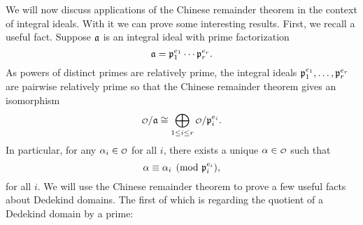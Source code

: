     We will now discuss applications of the Chinese remainder theorem in the context of integral ideals. With it we can prove some interesting results. First, we recall a useful fact. Suppose $\mathfrak{a}$ is an integral ideal with prime factorization
    \[
      \mathfrak{a} = \mathfrak{p}_{1}^{e_{1}} \cdots \mathfrak{p}_{r}^{e_{r}}.
    \]
    As powers of distinct primes are relatively prime, the integral ideals $\mathfrak{p}_{1}^{e_{1}},\ldots,\mathfrak{p}_{r}^{e_{r}}$ are pairwise relatively prime so that the Chinese remainder theorem gives an isomorphism
    \[
      \smc{O}/\mf{a} \cong \bigop_{1 \le i \le r}\smc{O}/\mf{p}_{i}^{e_{i}}.
    \]
    In particular, for any $\a_{i} \in \smc{O}$ for all $i$, there exists a unique $\a \in \smc{O}$ such that
    \[
      \alpha \equiv \alpha_{i} \pmod{\mathfrak{p}_{i}^{e_{i}}},
    \]
    for all $i$. We will use the Chinese remainder theorem to prove a few useful facts about Dedekind domains. The first of which is regarding the quotient of a Dedekind domain by a prime:

